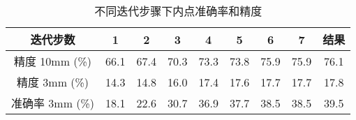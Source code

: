 \begin{table}[t]
  \centering
  \begin{tabular}{c|c|c|c|c|c|c|c|c}
    \toprule
    迭代步数 & 1 & 2 & 3 & 4 & 5 & 6 & 7 & 结果 \\
    \midrule
    精度 10mm (\%) & 66.1 &67.4 &70.3 &73.3 &73.8 &75.9 &75.9 &76.1\\
    精度 3mm (\%) & 14.3 &14.8 &16.0 &17.4 &17.6 &17.7 &17.7 &17.8\\
    准确率 3mm (\%)& 18.1 &22.6 &30.7 &36.9 &37.7 &38.5 &38.5 &39.5\\
    \bottomrule
  \end{tabular}
  \caption{不同迭代步骤下内点准确率和精度}
  \label{tab:ourlier_removal_metrics}
\end{table}






